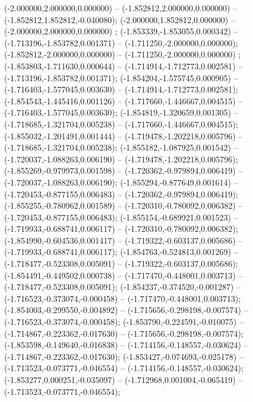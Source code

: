  (-2.000000,2.000000,0.000000) -- (-1.852812,2.000000,0.000000) -- (-1.852812,1.852812,-0.040080);
 (-2.000000,1.852812,0.000000) -- (-2.000000,2.000000,0.000000) ;
 (-1.853339,-1.853055,0.000342) -- (-1.713196,-1.853782,0.001371) -- (-1.711250,-2.000000,0.000000);
 (-1.852812,-2.000000,0.000000) -- (-1.711250,-2.000000,0.000000) ;
 (-1.853803,-1.711630,0.000644) -- (-1.714914,-1.712773,0.002581) -- (-1.713196,-1.853782,0.001371);
 (-1.854204,-1.575745,0.000905) -- (-1.716403,-1.577045,0.003630) -- (-1.714914,-1.712773,0.002581);
 (-1.854543,-1.445416,0.001126) -- (-1.717660,-1.446667,0.004515) -- (-1.716403,-1.577045,0.003630);
 (-1.854819,-1.320659,0.001305) -- (-1.718685,-1.321704,0.005238) -- (-1.717660,-1.446667,0.004515);
 (-1.855032,-1.201491,0.001444) -- (-1.719478,-1.202218,0.005796) -- (-1.718685,-1.321704,0.005238);
 (-1.855182,-1.087925,0.001542) -- (-1.720037,-1.088263,0.006190) -- (-1.719478,-1.202218,0.005796);
 (-1.855269,-0.979973,0.001598) -- (-1.720362,-0.979894,0.006419) -- (-1.720037,-1.088263,0.006190);
 (-1.855294,-0.877649,0.001614) -- (-1.720453,-0.877155,0.006483) -- (-1.720362,-0.979894,0.006419);
 (-1.855255,-0.780962,0.001589) -- (-1.720310,-0.780092,0.006382) -- (-1.720453,-0.877155,0.006483);
 (-1.855154,-0.689921,0.001523) -- (-1.719933,-0.688741,0.006117) -- (-1.720310,-0.780092,0.006382);
 (-1.854990,-0.604536,0.001417) -- (-1.719322,-0.603137,0.005686) -- (-1.719933,-0.688741,0.006117);
 (-1.854763,-0.524813,0.001269) -- (-1.718477,-0.523308,0.005091) -- (-1.719322,-0.603137,0.005686);
 (-1.854491,-0.449502,0.000738) -- (-1.717470,-0.448001,0.003713) -- (-1.718477,-0.523308,0.005091);
 (-1.854237,-0.374520,-0.001287) -- (-1.716523,-0.373074,-0.000458) -- (-1.717470,-0.448001,0.003713);
 (-1.854003,-0.299550,-0.004892) -- (-1.715656,-0.298198,-0.007574) -- (-1.716523,-0.373074,-0.000458);
 (-1.853790,-0.224591,-0.010075) -- (-1.714867,-0.223362,-0.017630) -- (-1.715656,-0.298198,-0.007574);
 (-1.853598,-0.149640,-0.016838) -- (-1.714156,-0.148557,-0.030624) -- (-1.714867,-0.223362,-0.017630);
 (-1.853427,-0.074693,-0.025178) -- (-1.713523,-0.073771,-0.046554) -- (-1.714156,-0.148557,-0.030624);
 (-1.853277,0.000251,-0.035097) -- (-1.712968,0.001004,-0.065419) -- (-1.713523,-0.073771,-0.046554);
